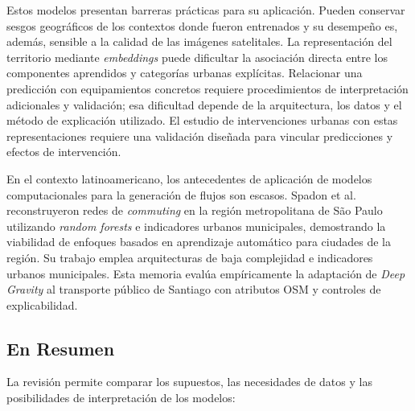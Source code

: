 Estos modelos presentan barreras prácticas para su aplicación. Pueden conservar sesgos geográficos de los contextos donde fueron entrenados y su desempeño es, además, sensible a la calidad de las imágenes satelitales. La representación del territorio mediante \textit{embeddings} puede dificultar la asociación directa entre los componentes aprendidos y categorías urbanas explícitas. Relacionar una predicción con equipamientos concretos requiere procedimientos de interpretación adicionales y validación; esa dificultad depende de la arquitectura, los datos y el método de explicación utilizado. El estudio de intervenciones urbanas con estas representaciones requiere una validación diseñada para vincular predicciones y efectos de intervención.

En el contexto latinoamericano, los antecedentes de aplicación de modelos computacionales para la generación de flujos son escasos. Spadon et al. \cite{spadon2019reconstructing} reconstruyeron redes de \textit{commuting} en la región metropolitana de São Paulo utilizando \textit{random forests} e indicadores urbanos municipales, demostrando la viabilidad de enfoques basados en aprendizaje automático para ciudades de la región. Su trabajo emplea arquitecturas de baja complejidad e indicadores urbanos municipales. Esta memoria evalúa empíricamente la adaptación de \textit{Deep Gravity} al transporte público de Santiago con atributos OSM y controles de explicabilidad.

\subsection{En Resumen}

La revisión permite comparar los supuestos, las necesidades de datos y las posibilidades de interpretación de los modelos:

